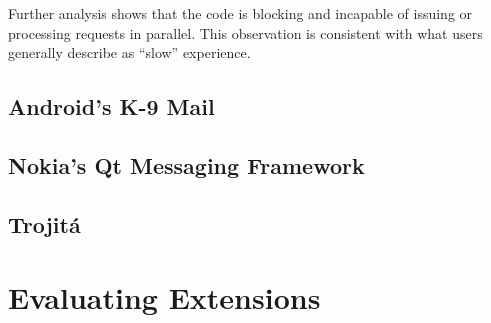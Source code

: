 \documentclass[trojita]{subfiles}
\begin{document}
Further analysis shows that the code is blocking and incapable of issuing or processing requests in parallel.  This
observation is consistent with what users generally describe as ``slow'' experience.

\subsection{Android's K-9 Mail}

\subsection{Nokia's Qt Messaging Framework}

\subsection{Trojitá}


\section{Evaluating Extensions}
\end{document}
